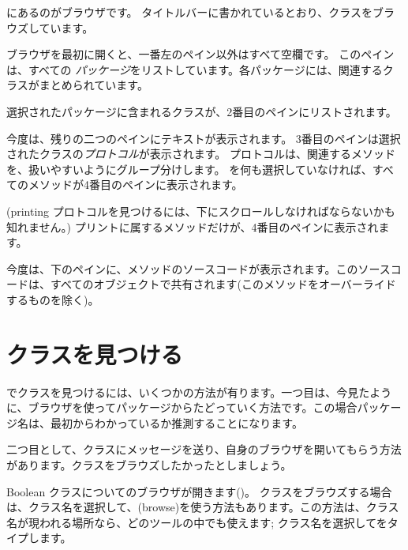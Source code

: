 \documentclass[a4paper,10pt,twoside]{book}
\begin{document}
にあるのがブラウザです。
タイトルバーに書かれているとおり、クラスをブラウズしています。

ブラウザを最初に開くと、一番左のペイン以外はすべて空欄です。
このペインは、すべての \emph{パッケージ}をリストしています。各パッケージには、関連するクラスがまとめられています。

選択されたパッケージに含まれるクラスが、2番目のペインにリストされます。

今度は、残りの二つのペインにテキストが表示されます。
3番目のペインは選択されたクラスの\emph{プロトコル}が表示されます。
プロトコルは、関連するメソッドを、扱いやすいようにグループ分けします。
を何も選択していなければ、すべてのメソッドが4番目のペインに表示されます。

(printing プロトコルを見つけるには、下にスクロールしなければならないかも知れません。)
プリントに属するメソッドだけが、4番目のペインに表示されます。

今度は、下のペインに、メソッドのソースコードが表示されます。このソースコードは、すべてのオブジェクトで共有されます(このメソッドをオーバーライドするものを除く)。

\section{クラスを見つける}

\pharo でクラスを見つけるには、いくつかの方法が有ります。一つ目は、今見たように、ブラウザを使ってパッケージからたどっていく方法です。この場合パッケージ名は、最初からわかっているか推測することになります。

二つ目として、クラスにメッセージを送り、自身のブラウザを開いてもらう方法があります。クラスをブラウズしたかったとしましょう。

Boolean クラスについてのブラウザが開きます()。
クラスをブラウズする場合は、クラス名を選択して、(browse)を使う方法もあります。この方法は、クラス名が現われる場所なら、どのツールの中でも使えます;
クラス名を選択してをタイプします。
\end{document}
